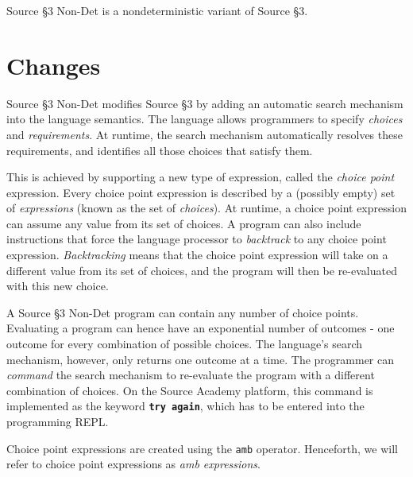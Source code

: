 





Source \S 3 Non-Det is a nondeterministic variant of Source \S 3.

\section*{Changes}

Source \S 3 Non-Det modifies Source \S 3 by adding an automatic search mechanism into the language semantics. The language allows programmers to specify \emph{choices} and \emph{requirements}. At runtime, the search mechanism automatically resolves these requirements, and identifies all those choices that satisfy them. \newline

This is achieved by supporting a new type of expression, called the \emph{choice point} expression. Every choice point expression is described by a (possibly empty) set of \emph{expressions} (known as the set of \emph{choices}). At runtime, a choice point expression can assume any value from its set of choices. A program can also include instructions that force the language processor to \emph{backtrack} to any choice point expression. \emph{Backtracking} means that the choice point expression will take on a different value from its set of choices, and the program will then be re-evaluated with this new choice. \newline

A Source \S 3 Non-Det program can contain any number of choice points. Evaluating a program can hence have an exponential number of outcomes - one outcome for every combination of possible choices. The language's search mechanism, however, only returns one outcome at a time. The programmer can \emph{command} the search mechanism to re-evaluate the program with a different combination of choices. On the Source Academy platform, this command is implemented as the keyword
\textbf{\texttt{try again}}, which has to be entered into the programming REPL. \newline

Choice point expressions are created using the \texttt{amb} operator. Henceforth, we will refer to choice point expressions as \emph{amb expressions}.


